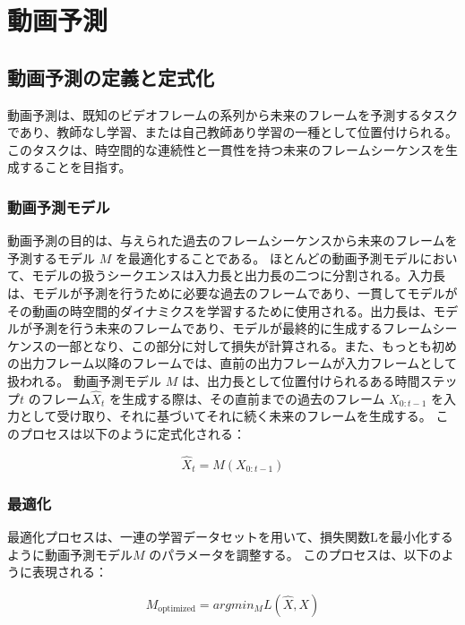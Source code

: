 \chapter{動画予測}

  \section{動画予測の定義と定式化}

    動画予測は、既知のビデオフレームの系列から未来のフレームを予測するタスクであり、教師なし学習、または自己教師あり学習の一種として位置付けられる。
    このタスクは、時空間的な連続性と一貫性を持つ未来のフレームシーケンスを生成することを目指す。

    \subsection{動画予測モデル}
    動画予測の目的は、与えられた過去のフレームシーケンスから未来のフレームを予測するモデル \( M \) を最適化することである。
    ほとんどの動画予測モデルにおいて、モデルの扱うシークエンスは入力長と出力長の二つに分割される。入力長は、モデルが予測を行うために必要な過去のフレームであり、一貫してモデルがその動画の時空間的ダイナミクスを学習するために使用される。出力長は、モデルが予測を行う未来のフレームであり、モデルが最終的に生成するフレームシーケンスの一部となり、この部分に対して損失が計算される。また、もっとも初めの出力フレーム以降のフレームでは、直前の出力フレームが入力フレームとして扱われる。
    動画予測モデル \( M \) は、出力長として位置付けられるある時間ステップ\( t\) のフレーム\( \hat{X}_{t} \) を生成する際は、その直前までの過去のフレーム \( X_{0:t-1} \) を入力として受け取り、それに基づいてそれに続く未来のフレームを生成する。
    このプロセスは以下のように定式化される：

    \begin{equation}
    \hat{X}_{t} = M(X_{0:t-1})
    \end{equation}

    \subsection{最適化}
    最適化プロセスは、一連の学習データセットを用いて、損失関数Lを最小化するように動画予測モデル\( M \) のパラメータを調整する。
    このプロセスは、以下のように表現される：

    \begin{equation}
    M_{\text{optimized}} = argmin_{M} L(\hat{X}, X)
    \end{equation}

